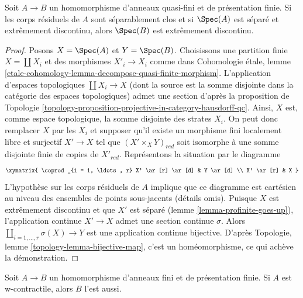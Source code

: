 \begin{lemma}
\label{lemma-finite-finitely-presented-over-extremally-disconnected}
Soit $A \to B$ un homomorphisme d'anneaux quasi-fini et de présentation finie.
Si les corps résiduels de $A$ sont séparablement clos
et si $\Spec(A)$ est séparé et extrêmement discontinu, alors $\Spec(B)$ est
extrêmement discontinu.
\end{lemma}

\begin{proof}
Posons $X = \Spec(A)$ et $Y = \Spec(B)$. Choisissons une partition finie
$X = \coprod X_i$ et des morphismes $X'_i \to X_i$ comme dans
Cohomologie \'etale, lemme
\ref{etale-cohomology-lemma-decompose-quasi-finite-morphism}.
L'application d'espaces topologiques $\coprod X_i \to X$ (dont la source
est la somme disjointe dans la catégorie des espaces topologiques)
admet une section d'après la proposition de Topologie
\ref{topology-proposition-projective-in-category-hausdorff-qc}.
Ainsi, $X$ est, comme espace topologique, la somme disjointe des
strates $X_i$. On peut donc remplacer $X$ par les $X_i$ et supposer qu'il
existe un morphisme fini localement libre et surjectif $X' \to X$ tel que
$(X' \times_X Y)_{red}$ soit isomorphe à une somme disjointe finie de
copies de $X'_{red}$. Représentons la situation par le diagramme
$$
\xymatrix{
\coprod_{i = 1, \ldots, r} X' \ar[r] \ar[d] & Y \ar[d] \\
X' \ar[r] & X
}
$$
L'hypothèse sur les corps résiduels de $A$ implique que
ce diagramme est cartésien au niveau des ensembles de points
sous-jacents (détails omis).
Puisque $X$ est extrêmement discontinu et que $X'$ est séparé
(lemme \ref{lemma-profinite-goes-up}), l'application continue
$X' \to X$ admet une section continue $\sigma$. Alors
$\coprod_{i = 1, \ldots, r} \sigma(X) \to Y$ est une application continue
bijective. D'après
Topologie, lemme \ref{topology-lemma-bijective-map},
c'est un homéomorphisme, ce qui achève la démonstration.
\end{proof}

\begin{lemma}
\label{lemma-finite-finitely-presented-over-w-contractible}
Soit $A \to B$ un homomorphisme d'anneaux fini et de présentation finie.
Si $A$ est w-contractile, alors $B$ l'est aussi.
\end{lemma}

